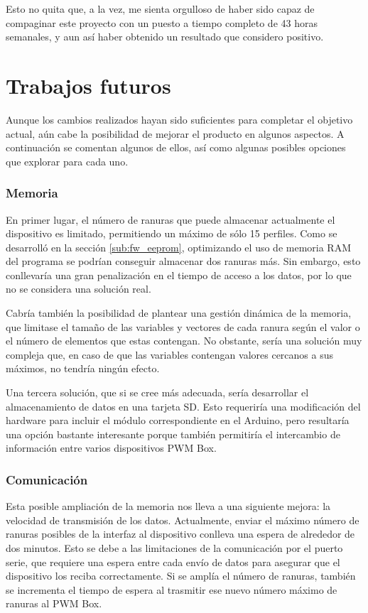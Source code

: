 Esto no quita que, a la vez, me sienta orgulloso de haber sido capaz de compaginar este proyecto con un puesto a tiempo completo de 43 horas semanales, y aun así haber obtenido un resultado que considero positivo.

\section{Trabajos futuros}

Aunque los cambios realizados hayan sido suficientes para completar el objetivo actual, aún cabe la posibilidad de mejorar el producto en algunos aspectos. A continuación se comentan algunos de ellos, así como algunas posibles opciones que explorar para cada uno.

\subsubsection{Memoria}

En primer lugar, el número de ranuras que puede almacenar actualmente el dispositivo es limitado, permitiendo un máximo de sólo 15 perfiles. Como se desarrolló en la sección \ref{sub:fw_eeprom}, optimizando el uso de memoria RAM del programa se podrían conseguir almacenar dos ranuras más. Sin embargo, esto conllevaría una gran penalización en el tiempo de acceso a los datos, por lo que no se considera una solución real.

Cabría también la posibilidad de plantear una gestión dinámica de la memoria, que limitase el tamaño de las variables y vectores de cada ranura según el valor o el número de elementos que estas contengan. No obstante, sería una solución muy compleja que, en caso de que las variables contengan valores cercanos a sus máximos, no tendría ningún efecto.

Una tercera solución, que si se cree más adecuada, sería desarrollar el almacenamiento de datos en una tarjeta SD. Esto requeriría una modificación del hardware para incluir el módulo correspondiente en el Arduino, pero resultaría una opción bastante interesante porque también permitiría el intercambio de información entre varios dispositivos PWM Box.

\subsubsection{Comunicación}

Esta posible ampliación de la memoria nos lleva a una siguiente mejora: la velocidad de transmisión de los datos. Actualmente, enviar el máximo número de ranuras posibles de la interfaz al dispositivo conlleva una espera de alrededor de dos minutos. Esto se debe a las limitaciones de la comunicación por el puerto serie, que requiere una espera entre cada envío de datos para asegurar que el dispositivo los reciba correctamente. Si se amplía el número de ranuras, también se incrementa el tiempo de espera al trasmitir ese nuevo número máximo de ranuras al PWM Box.

